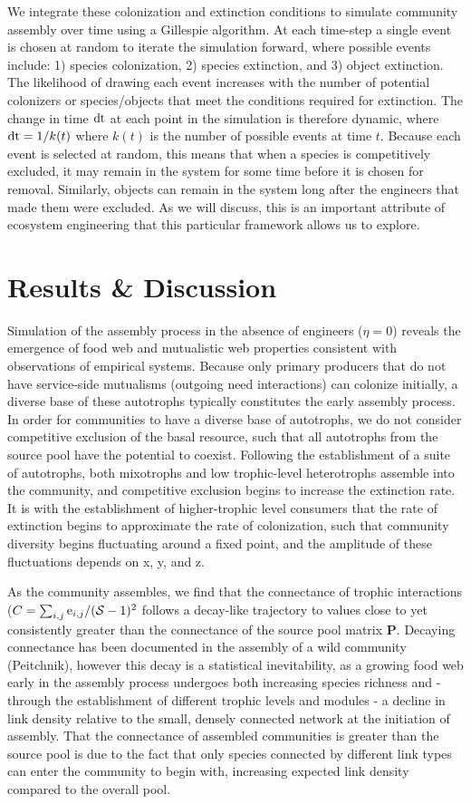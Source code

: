 \documentclass[twocolumn,preprintnumbers,amsmath,amssymb,superscriptaddress]{revtex4}
\newcommand{\rr}[1]{{\rm #1}}
\begin{document}
We integrate these colonization and extinction conditions to simulate community assembly over time using a Gillespie algorithm.
At each time-step a single event is chosen at random to iterate the simulation forward, where possible events include: 1) species colonization, 2) species extinction, and 3) object extinction.
The likelihood of drawing each event increases with the number of potential colonizers or species/objects that meet the conditions required for extinction.
The change in time $\rr{dt}$ at each point in the simulation is therefore dynamic, where $\rr{dt} = 1/k(t)$ where $k(t)$ is the number of possible events at time $t$.
Because each event is selected at random, this means that when a species is competitively excluded, it may remain in the system for some time before it is chosen for removal.
Similarly, objects can remain in the system long after the engineers that made them were excluded.
As we will discuss, this is an important attribute of ecosystem engineering that this particular framework allows us to explore.


\section*{Results \& Discussion}
Simulation of the assembly process in the absence of engineers ($\eta=0$) reveals the emergence of food web and mutualistic web properties consistent with observations of empirical systems.
Because only primary producers that do not have service-side mutualisms (outgoing need interactions) can colonize initially, a diverse base of these autotrophs typically constitutes the early assembly process.
In order for communities to have a diverse base of autotrophs, we do not consider competitive exclusion of the basal resource, such that all autotrophs from the source pool have the potential to coexist.
Following the establishment of a suite of autotrophs, both mixotrophs and low trophic-level heterotrophs assemble into the community, and competitive exclusion begins to increase the extinction rate.
It is with the establishment of higher-trophic level consumers that the rate of extinction begins to approximate the rate of colonization, such that community diversity begins fluctuating around a fixed point, and the amplitude of these fluctuations depends on x, y, and z.

As the community assembles, we find that the connectance of trophic interactions ($C=\sum_{i,j} \rr{e}_{i,j}/(\mathcal{S}-1)^2$ follows a decay-like trajectory to values close to yet consistently greater than the connectance of the source pool matrix $\bm{P}$.
Decaying connectance has been documented in the assembly of a wild community (Peitchnik), however this decay is a statistical inevitability, as a growing food web early in the assembly process undergoes both increasing species richness and - through the establishment of different trophic levels and modules - a decline in link density relative to the small, densely connected network at the initiation of assembly.
That the connectance of assembled communities is greater than the source pool is due to the fact that only species connected by different link types can enter the community to begin with, increasing expected link density compared to the overall pool.
\end{document}
